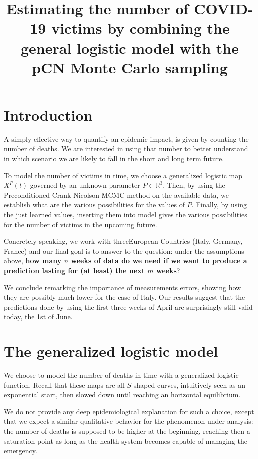 \documentclass[8pt]{article}
\title {Estimating the number of COVID-19 victims by combining the
general logistic model with the pCN Monte Carlo sampling}
\begin{document}
\maketitle
\section{Introduction}
A simply effective way to quantify an epidemic
impact, is given by counting the number of deaths.
We are interested in using that number
to better understand in which scenario we are likely to fall 
in the short and long term future.


To model the number of victims in time, we choose
a generalized logistic map $X^P(t)$ governed by an unknown parameter 
$P \in \mathbb{R}^3$. Then, by using the Preconditioned Crank-Nicolson
MCMC method on the available data,
we establish what are the various possibilities
for the  
values of $P$. Finally, by using the just learned values,
inserting them into model gives the various possibilities
for the number of victims in the upcoming future.


Concretely speaking, we work with threeEuropean Countries
(Italy, Germany, France) and our final
goal is to answer to the question:
under the assumptions above,
\textbf{
how many $n$ weeks of data do we need if we want to produce a prediction 
lasting for (at least) the next $m$ weeks}?


We conclude remarking the importance of measurements errors,
showing how they are possibly much lower for the case of Italy.
Our results suggest that the predictions done by using the first
three weeks of April are surprisingly still valid today,
the 1st of June.

\section {The generalized logistic model}
We choose to model the number of deaths in time with a
generalized logistic function. 
Recall that these maps are all
$S$-shaped curves, intuitively seen as an exponential start,
then slowed down until reaching an horizontal equilibrium. 


We do not provide any deep epidemiological explanation for such a choice,
except that we expect a similar qualitative behavior for the phenomenon
under analysis: the number of deaths is supposed to be higher at the beginning,
reaching then a saturation point as long as the health system becomes
capable of managing the emergency.
\end{document}
